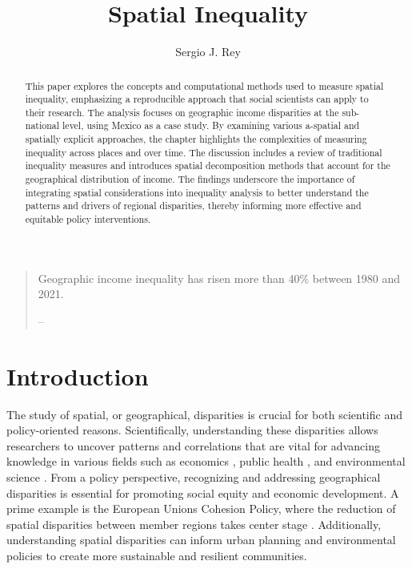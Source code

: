 \documentclass[
  a4paper, 
  twoside,
  final
]{article}
\title{Spatial Inequality}
\author{%
Sergio J. Rey\parnote{San Diego State University, San Diego, USA}}
\date{}
\begin{document}
\maketitle
\begin{abstract}
This paper explores the concepts and computational methods used to
measure spatial inequality, emphasizing a reproducible approach that
social scientists can apply to their research. The analysis focuses on
geographic income disparities at the sub-national level, using Mexico as
a case study. By examining various a-spatial and spatially explicit
approaches, the chapter highlights the complexities of measuring
inequality across places and over time. The discussion includes a review
of traditional inequality measures and introduces spatial decomposition
methods that account for the geographical distribution of income. The
findings underscore the importance of integrating spatial considerations
into inequality analysis to better understand the patterns and drivers
of regional disparities, thereby informing more effective and equitable
policy interventions.
\end{abstract}


\begin{quote}
Geographic income inequality has risen more than 40\% between 1980 and
2021.

-- \citet{u.s.departmentofcommerce2023GeographicInequality}
\end{quote}

\section{Introduction}\label{introduction}

The study of spatial, or geographical, disparities is crucial for both
scientific and policy-oriented reasons. Scientifically, understanding
these disparities allows researchers to uncover patterns and
correlations that are vital for advancing knowledge in various fields
such as economics \citep{kanbur2005SpatialInequality}, public health
\citep{debnath2024GeographicDisparities}, and environmental science
\citep{venter2023EnvironmentalJustice}. From a policy perspective,
recognizing and addressing geographical disparities is essential for
promoting social equity and economic development. A prime example is the
European Union\textquotesingle s Cohesion Policy, where the reduction of
spatial disparities between member regions takes center stage
\citep{agnieszka2019RegionalInequalities}. Additionally, understanding
spatial disparities can inform urban planning and environmental policies
to create more sustainable and resilient communities.
\end{document}
